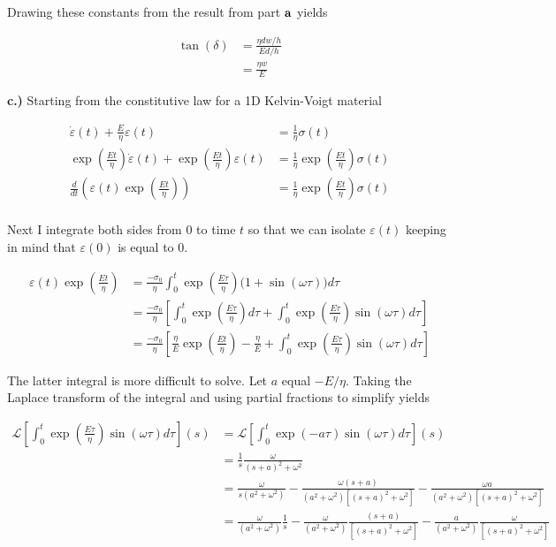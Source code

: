 Drawing these constants from the result from part $\bf{a}$ yields

\begin{align*}
    \tan{(\delta)} &= \frac{\eta d w /h}{Ed/h}\\
    &= \frac{\eta w}{E}
\end{align*}

\textbf{c.)} Starting from the constitutive law for a 1D Kelvin-Voigt material

\begin{align*}
    \dot\varepsilon(t) + \frac{E}{\eta}\varepsilon(t) &= \frac{1}{\eta}\sigma(t) \\
    \exp{\left(\frac{Et}{\eta}\right)}\dot\varepsilon(t) + \exp{\left(\frac{Et}{\eta}\right)}\varepsilon(t) &= \frac{1}{\eta}\exp{\left(\frac{Et}{\eta}\right)}\sigma(t) \\
    \frac{d}{dt}\left(\varepsilon(t)\exp{\left(\frac{Et}{\eta}\right)}\right) &= \frac{1}{\eta}\exp{\left(\frac{Et}{\eta}\right)}\sigma(t) \\
\end{align*}

Next I integrate both sides from $0$ to time $t$ so that we can isolate $\varepsilon(t)$ keeping in mind that $\varepsilon(0)$ is equal to $0$.

\begin{align*}
    \varepsilon(t)\exp{\left(\frac{Et}{\eta}\right)} &= \frac{-\sigma_0}{\eta}\int_0^t\exp{\left(\frac{E\tau}{\eta}\right)(1+\sin{(\omega \tau))}}d\tau \\
    &= \frac{-\sigma_0}{\eta} \left[ \int_0^t \exp{\left(\frac{E\tau}{\eta}\right)}d\tau + \int_0^t\exp{\left(\frac{E\tau}{\eta}\right)}\sin{(\omega \tau)}d\tau\right] \\
    &= \frac{-\sigma_0}{\eta} \left[ \frac{\eta}{E}\exp{\left(\frac{Et}{\eta}\right)} - \frac{\eta}{E} + \int_0^t\exp{\left(\frac{E\tau}{\eta}\right)}\sin{(\omega \tau)}d\tau\right]
\end{align*}

The latter integral is more difficult to solve. Let $a$ equal $-E/\eta$. Taking the Laplace transform of the integral and using partial fractions to simplify yields

\begin{align*}
    \mathcal{L}\left[\int_0^t\exp{\left(\frac{E\tau}{\eta}\right)}\sin{(\omega \tau)}d\tau\right](s) &= \mathcal{L}\left[\int_0^t\exp{\left(-a\tau\right)}\sin{(\omega \tau)}d\tau\right](s)\\
    &= \frac{1}{s}\frac{\omega}{(s+a)^2+\omega^2} \\
    &= \frac{\omega}{s(a^2+\omega^2)} - \frac{\omega(s+a)}{(a^2+\omega^2)[(s+a)^2+\omega^2]} - \frac{\omega a
    }{(a^2+\omega^2)[(s+a)^2+\omega^2]} \\
    &= \frac{\omega}{(a^2+\omega^2)}\frac{1}{s} - \frac{\omega}{(a^2+\omega^2)}\frac{(s+a)}{[(s+a)^2+\omega^2]} - \frac{a}{(a^2+\omega^2)}\frac{\omega
    }{[(s+a)^2+\omega^2]} \\
\end{align*}


